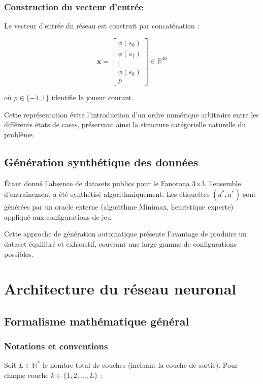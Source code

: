 \documentclass[12pt,a4paper]{report}
\numberwithin{equation}{section}
\begin{document}
\subsection{Construction du vecteur d'entrée}
Le vecteur d'entrée du réseau est construit par concaténation :

$$\mathbf{x} = \begin{bmatrix}
\phi(s_0)\\
\phi(s_1)\\
\vdots\\
\phi(s_8)\\
p
\end{bmatrix} \in \mathbb{R}^{46}$$

où $p \in \{-1, 1\}$ identifie le joueur courant.

\begin{remark}
Cette représentation évite l'introduction d'un ordre numérique arbitraire entre les différents états de cases, préservant ainsi la structure catégorielle naturelle du problème.
\end{remark}

\section{Génération synthétique des données}

\begin{important}
Étant donné l'absence de datasets publics pour le Fanorona 3×3, l'ensemble d'entraînement a été synthétisé algorithmiquement. Les étiquettes $(d^*, a^*)$ sont générées par un oracle externe (algorithme Minimax, heuristique experte) appliqué aux configurations de jeu.
\end{important}

Cette approche de génération automatique présente l'avantage de produire un dataset équilibré et exhaustif, couvrant une large gamme de configurations possibles.

\chapter{Architecture du réseau neuronal}

\section{Formalisme mathématique général}

\subsection{Notations et conventions}
Soit $L \in \mathbb{N}^*$ le nombre total de couches (incluant la couche de sortie). Pour chaque couche $k \in \{1, 2, \ldots, L\}$ :
\end{document}
